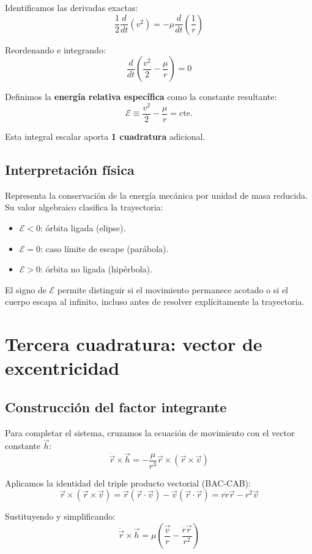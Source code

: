 Identificamos las derivadas exactas:
\[
\frac{1}{2}\frac{d}{dt}(v^2) = -\mu \frac{d}{dt}\left(\frac{1}{r}\right)
\]

Reordenando e integrando:
\[
\frac{d}{dt}\left(\frac{v^2}{2} - \frac{\mu}{r}\right) = 0
\]

Definimos la \textbf{energía relativa específica} como la constante resultante:
\[
\mathcal{E} \equiv \frac{v^2}{2} - \frac{\mu}{r} = \text{cte.}
\]

Esta integral escalar aporta \textbf{1 cuadratura} adicional.

\subsection{Interpretación física}
Representa la conservación de la energía mecánica por unidad de masa reducida. Su valor algebraico clasifica la trayectoria:
\begin{itemize}
    \item \(\mathcal{E} < 0\): órbita ligada (elipse).
    \item \(\mathcal{E} = 0\): caso límite de escape (parábola).
    \item \(\mathcal{E} > 0\): órbita no ligada (hipérbola).
\end{itemize}

\begin{importante}
El signo de \(\mathcal{E}\) permite distinguir si el movimiento permanece acotado o si el cuerpo escapa al infinito, incluso antes de resolver explícitamente la trayectoria.
\end{importante}

\section{Tercera cuadratura: vector de excentricidad}
\subsection{Construcción del factor integrante}
Para completar el sistema, cruzamos la ecuación de movimiento con el vector constante \(\vec{h}\):
\[
\ddot{\vec{r}} \times \vec{h} = -\frac{\mu}{r^3}\vec{r} \times (\vec{r} \times \vec{v})
\]

Aplicamos la identidad del triple producto vectorial (BAC-CAB):
\[
\vec{r} \times (\vec{r} \times \vec{v}) = \vec{r}(\vec{r} \cdot \vec{v}) - \vec{v}(\vec{r} \cdot \vec{r}) = r\dot{r}\vec{r} - r^2\vec{v}
\]

Sustituyendo y simplificando:
\[
\ddot{\vec{r}} \times \vec{h} = \mu\left(\frac{\vec{v}}{r} - \frac{\dot{r}\vec{r}}{r^2}\right)
\]


